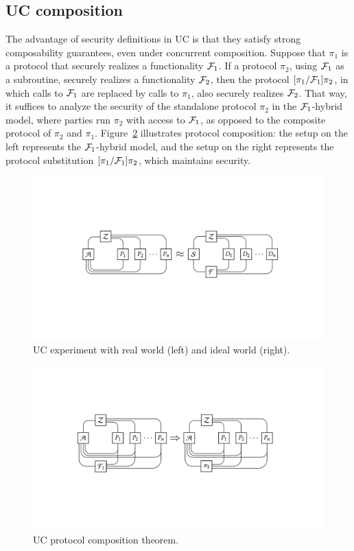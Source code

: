 \subsection{UC composition}
\label{subsec:composition}

The advantage of security definitions in UC is that they satisfy strong
composability guarantees, even under concurrent composition. Suppose that $\pi_1$
is a protocol that securely realizes a functionality $\mathcal{{F}}_1$. If a protocol
$\pi_2$, using $\mathcal{{F}}_1$ as a subroutine, securely realizes a functionality
$\mathcal{{F}}_2$, then the protocol $[\pi_1 / \mathcal{{F}}_1]\pi_2$, in which calls to
$\mathcal{{F}}_1$ are replaced by calls to $\pi_1$, also securely realizes
$\mathcal{{F}}_2$. That way, it suffices to analyze the security of the standalone
protocol $\pi_2$ in the $\mathcal{{F}}_1$-hybrid model, where parties run $\pi_2$ with
access to $\mathcal{{F}}_1$, as opposed to the composite protocol of $\pi_2$ and
$\pi_1$. Figure~\ref{fig:uc-composition} illustrates protocol composition: the
setup on the left represents the $\mathcal{{F}}_1$-hybrid model, and the setup on the
right represents the protocol substitution $[\pi_1 / \mathcal{{F}}_1]\pi_2$, which
maintains security.

\begin{figure}
  \centering
  \includegraphics[width=\linewidth]{graphics/uc-experiment}
  \caption{UC experiment with real world (left) and ideal world (right).}
  \label{fig:uc-experiment}
\end{figure}

\begin{figure}
  \centering
  \includegraphics[width=\linewidth]{graphics/composition}
  \caption{UC protocol composition theorem.}
  \label{fig:uc-composition}
\end{figure}
